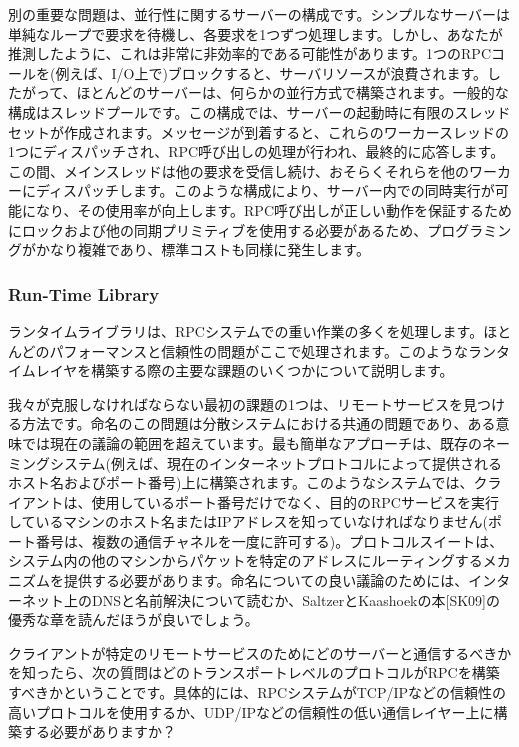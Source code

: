 別の重要な問題は、並行性に関するサーバーの構成です。シンプルなサーバーは単純なループで要求を待機し、各要求を1つずつ処理します。しかし、あなたが推測したように、これは非常に非効率的である可能性があります。1つのRPCコールを(例えば、I/O上で)ブロックすると、サーバリソースが浪費されます。したがって、ほとんどのサーバーは、何らかの並行方式で構築されます。一般的な構成はスレッドプールです。この構成では、サーバーの起動時に有限のスレッドセットが作成されます。メッセージが到着すると、これらのワーカースレッドの1つにディスパッチされ、RPC呼び出しの処理が行われ、最終的に応答します。この間、メインスレッドは他の要求を受信し続け、おそらくそれらを他のワーカーにディスパッチします。このような構成により、サーバー内での同時実行が可能になり、その使用率が向上します。RPC呼び出しが正しい動作を保証するためにロックおよび他の同期プリミティブを使用する必要があるため、プログラミングがかなり複雑であり、標準コストも同様に発生します。

\hypertarget{run-time-library}{%
\subsubsection*{Run-Time Library}\label{run-time-library}}

ランタイムライブラリは、RPCシステムでの重い作業の多くを処理します。ほとんどのパフォーマンスと信頼性の問題がここで処理されます。このようなランタイムレイヤを構築する際の主要な課題のいくつかについて説明します。

我々が克服しなければならない最初の課題の1つは、リモートサービスを見つける方法です。命名のこの問題は分散システムにおける共通の問題であり、ある意味では現在の議論の範囲を超えています。最も簡単なアプローチは、既存のネーミングシステム(例えば、現在のインターネットプロトコルによって提供されるホスト名およびポート番号)上に構築されます。このようなシステムでは、クライアントは、使用しているポート番号だけでなく、目的のRPCサービスを実行しているマシンのホスト名またはIPアドレスを知っていなければなりません(ポート番号は、複数の通信チャネルを一度に許可する)。プロトコルスイートは、システム内の他のマシンからパケットを特定のアドレスにルーティングするメカニズムを提供する必要があります。命名についての良い議論のためには、インターネット上のDNSと名前解決について読むか、SaltzerとKaashoekの本{[}SK09{]}の優秀な章を読んだほうが良いでしょう。

クライアントが特定のリモートサービスのためにどのサーバーと通信するべきかを知ったら、次の質問はどのトランスポートレベルのプロトコルがRPCを構築すべきかということです。具体的には、RPCシステムがTCP/IPなどの信頼性の高いプロトコルを使用するか、UDP/IPなどの信頼性の低い通信レイヤー上に構築する必要がありますか？

